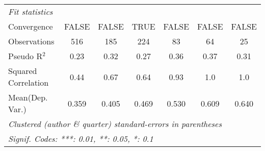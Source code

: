 \begin{tabular}{lcccccc}
   \midrule
   \emph{Fit statistics}\\
   Convergence                                                &FALSE         & FALSE         & TRUE         & FALSE   & FALSE        & FALSE\\  
   Observations                                               & 516          & 185           & 224          & 83      & 64           & 25\\  
   Pseudo R$^2$                                               & 0.23         & 0.32          & 0.27         & 0.36    & 0.37         & 0.31\\  
   Squared Correlation                                        & 0.44         & 0.67          & 0.64         & 0.93    & 1.0          & 1.0\\  
Mean(Dep. Var.) & 0.359 & 0.405 & 0.469 & 0.530 & 0.609 & 0.640 \\
   \midrule \midrule
   \multicolumn{7}{l}{\emph{Clustered (author \& quarter) standard-errors in parentheses}}\\
   \multicolumn{7}{l}{\emph{Signif. Codes: ***: 0.01, **: 0.05, *: 0.1}}\\
\end{tabular}
\par\endgroup
